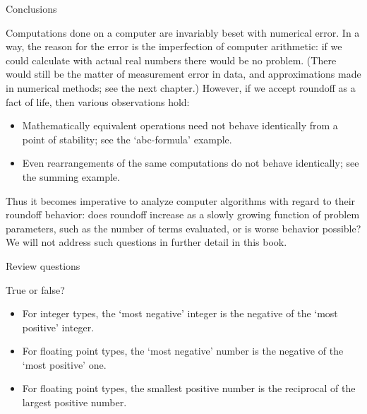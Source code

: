 
 {Conclusions}

Computations done on a computer are invariably beset with numerical error.
In a way, the reason for the error is the imperfection of computer
arithmetic: if we could calculate with actual real numbers there would
be no problem. (There would still be the matter of measurement error
in data, and approximations made in numerical methods; see the next
chapter.) However, if we accept roundoff as a fact of life, then
various observations hold:
\begin{itemize}
\item Mathematically equivalent operations need not behave identically
  from a point of stability; see the `abc-formula' example.
\item Even rearrangements of the same computations do not behave
  identically; see the summing example.
\end{itemize}
Thus it
becomes imperative to analyze computer algorithms with regard to their
roundoff behavior: does roundoff increase as a slowly growing
function of problem parameters, such as the number of terms evaluated,
or is worse behavior possible? We will not address such questions in
further detail in this book.


 {Review questions}

\begin{exercise}
  True or false?
  \begin{itemize}
  \item For integer types, the `most negative' integer is the negative
    of the `most positive' integer.
  \item For floating point types, the `most negative' number is the negative
    of the `most positive' one.
  \item For floating point types, the smallest positive number is the reciprocal
    of the largest positive number.
  \end{itemize}
\end{exercise}

